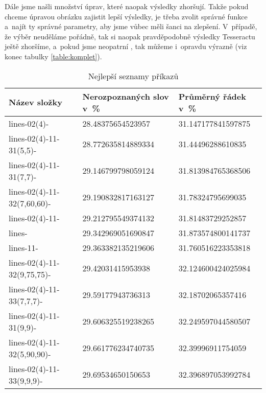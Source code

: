 \documentclass[12pt,oneside]{report}			%
\begin{document}
	Dále jsme našli množství úprav, které naopak výsledky zhoršují. Takže pokud chceme úpravou obrázku zajistit lepší výsledky, je třeba zvolit správné funkce a~najít ty správné parametry, aby jsme vůbec měli šanci na zlepšení. V~případě, že výběr neuděláme pořádně, tak si naopak pravděpodobně výsledky Tesseractu ještě zhoršíme, a~pokud jsme neopatrní , tak můžeme i~opravdu výrazně (\gls{viz} konec tabulky \ref{table:komplet}).
\begin{table}[h]
\begin{tabular}{|l|l|l|}
\hline
Název složky                & Nerozpoznaných slov  v~\% & Průměrný řádek v~\% \\ \hline
lines-02(4)-                 & 28.48375654523957         & 31.147177841597875 \\ \hline
lines-02(4)-11-31(5,5)-     & 28.772635814889334        & 31.44496288610835  \\ \hline
lines-02(4)-11-31(7,7)-     & 29.146799798059124        & 31.813984765368506 \\ \hline
lines-02(4)-11-32(7,60,60)- & 29.190832817163127        & 31.78324795699035  \\ \hline
lines-02(4)-11-             & 29.212795549374132        & 31.81483729252857  \\ \hline
lines-                      & 29.342969051690847        & 31.873574800141737 \\ \hline
lines-11- & 29.363382135219606 & 31.760516223353818 \\ \hline
lines-02(4)-11-32(9,75,75)- & 29.42031415953938         & 32.124600424025984 \\ \hline
lines-02(4)-11-33(7,7,7)-  & 29.59177943736313         & 32.18702065357416  \\ \hline
lines-02(4)-11-31(9,9)-     & 29.606325519238265        & 32.249597044580507 \\ \hline
lines-02(4)-11-32(5,90,90)- & 29.661776234740735        & 32.39996911754059  \\ \hline
lines-02(4)-11-33(9,9,9)-   & 29.69534650150653         & 32.396897053992784 \\ \hline
\end{tabular}
\caption{Nejlepší  seznamy příkazů}
\label{table:nejlepsi}
\end{table}
	
	\appendix
\end{document}

